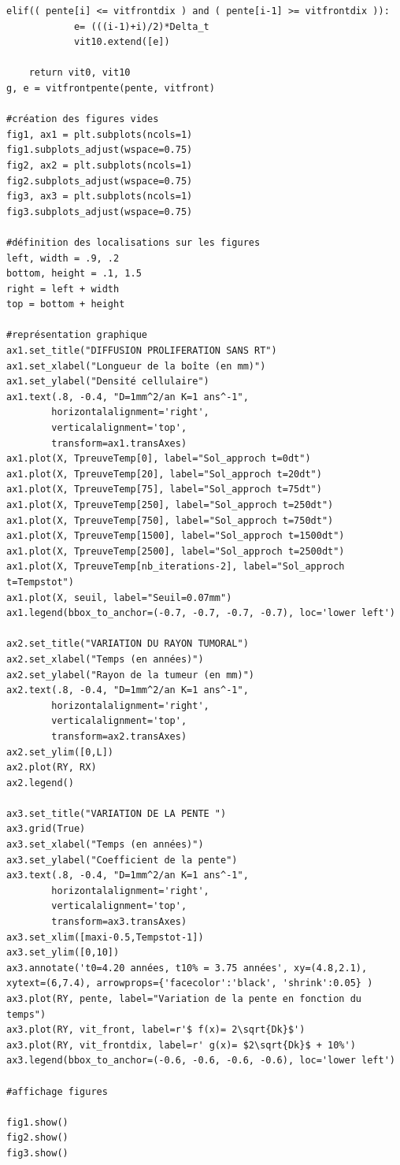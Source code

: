 \documentclass[12pt,a4paper]{article}
\begin{document}
\begin{lstlisting}[style=stylepython]
        elif(( pente[i] <= vitfrontdix ) and ( pente[i-1] >= vitfrontdix )):
            e= (((i-1)+i)/2)*Delta_t
            vit10.extend([e])            
                  
    return vit0, vit10
g, e = vitfrontpente(pente, vitfront)

#création des figures vides 
fig1, ax1 = plt.subplots(ncols=1)
fig1.subplots_adjust(wspace=0.75)
fig2, ax2 = plt.subplots(ncols=1)
fig2.subplots_adjust(wspace=0.75)  
fig3, ax3 = plt.subplots(ncols=1)
fig3.subplots_adjust(wspace=0.75)

#définition des localisations sur les figures
left, width = .9, .2
bottom, height = .1, 1.5
right = left + width
top = bottom + height

#représentation graphique
ax1.set_title("DIFFUSION PROLIFERATION SANS RT")
ax1.set_xlabel("Longueur de la boîte (en mm)")
ax1.set_ylabel("Densité cellulaire")
ax1.text(.8, -0.4, "D=1mm^2/an K=1 ans^-1",
        horizontalalignment='right',
        verticalalignment='top',
        transform=ax1.transAxes)
ax1.plot(X, TpreuveTemp[0], label="Sol_approch t=0dt")
ax1.plot(X, TpreuveTemp[20], label="Sol_approch t=20dt")
ax1.plot(X, TpreuveTemp[75], label="Sol_approch t=75dt")
ax1.plot(X, TpreuveTemp[250], label="Sol_approch t=250dt")
ax1.plot(X, TpreuveTemp[750], label="Sol_approch t=750dt")
ax1.plot(X, TpreuveTemp[1500], label="Sol_approch t=1500dt")
ax1.plot(X, TpreuveTemp[2500], label="Sol_approch t=2500dt")
ax1.plot(X, TpreuveTemp[nb_iterations-2], label="Sol_approch t=Tempstot")
ax1.plot(X, seuil, label="Seuil=0.07mm")
ax1.legend(bbox_to_anchor=(-0.7, -0.7, -0.7, -0.7), loc='lower left')

ax2.set_title("VARIATION DU RAYON TUMORAL")
ax2.set_xlabel("Temps (en années)")
ax2.set_ylabel("Rayon de la tumeur (en mm)")
ax2.text(.8, -0.4, "D=1mm^2/an K=1 ans^-1",
        horizontalalignment='right',
        verticalalignment='top',
        transform=ax2.transAxes)
ax2.set_ylim([0,L])
ax2.plot(RY, RX)
ax2.legend()

ax3.set_title("VARIATION DE LA PENTE ")
ax3.grid(True)
ax3.set_xlabel("Temps (en années)")
ax3.set_ylabel("Coefficient de la pente")
ax3.text(.8, -0.4, "D=1mm^2/an K=1 ans^-1",
        horizontalalignment='right',
        verticalalignment='top',
        transform=ax3.transAxes)
ax3.set_xlim([maxi-0.5,Tempstot-1])
ax3.set_ylim([0,10])
ax3.annotate('t0=4.20 années, t10% = 3.75 années', xy=(4.8,2.1), xytext=(6,7.4), arrowprops={'facecolor':'black', 'shrink':0.05} )
ax3.plot(RY, pente, label="Variation de la pente en fonction du temps")
ax3.plot(RY, vit_front, label=r'$ f(x)= 2\sqrt{Dk}$')
ax3.plot(RY, vit_frontdix, label=r' g(x)= $2\sqrt{Dk}$ + 10%')
ax3.legend(bbox_to_anchor=(-0.6, -0.6, -0.6, -0.6), loc='lower left')

#affichage figures

fig1.show()
fig2.show()
fig3.show()
\end{lstlisting}
\newpage
\end{document}
